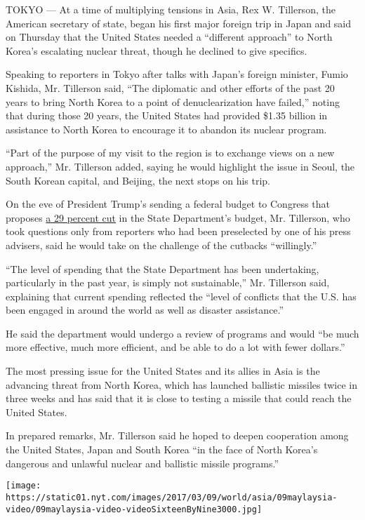 TOKYO --- At a time of multiplying tensions in Asia, Rex W. Tillerson,
the American secretary of state, began his first major foreign trip in
Japan and said on Thursday that the United States needed a ``different
approach'' to North Korea's escalating nuclear threat, though he
declined to give specifics.

Speaking to reporters in Tokyo after talks with Japan's foreign
minister, Fumio Kishida, Mr. Tillerson said, ``The diplomatic and other
efforts of the past 20 years to bring North Korea to a point of
denuclearization have failed,'' noting that during those 20 years, the
United States had provided \$1.35 billion in assistance to North Korea
to encourage it to abandon its nuclear program.

``Part of the purpose of my visit to the region is to exchange views on
a new approach,'' Mr. Tillerson added, saying he would highlight the
issue in Seoul, the South Korean capital, and Beijing, the next stops on
his trip.

On the eve of President Trump's sending a federal budget to Congress
that proposes
\href{https://www.nytimes.com/interactive/2017/03/15/us/politics/trump-budget-proposal.html}{a
29 percent cut} in the State Department's budget, Mr. Tillerson, who
took questions only from reporters who had been preselected by one of
his press advisers, said he would take on the challenge of the cutbacks
``willingly.''

``The level of spending that the State Department has been undertaking,
particularly in the past year, is simply not sustainable,'' Mr.
Tillerson said, explaining that current spending reflected the ``level
of conflicts that the U.S. has been engaged in around the world as well
as disaster assistance.''

He said the department would undergo a review of programs and would ``be
much more effective, much more efficient, and be able to do a lot with
fewer dollars.''

The most pressing issue for the United States and its allies in Asia is
the advancing threat from North Korea, which has launched ballistic
missiles twice in three weeks and has said that it is close to testing a
missile that could reach the United States.

In prepared remarks, Mr. Tillerson said he hoped to deepen cooperation
among the United States, Japan and South Korea ``in the face of North
Korea's dangerous and unlawful nuclear and ballistic missile programs.''

\texttt{[image: https://static01.nyt.com/images/2017/03/09/world/asia/09maylaysia-video/09maylaysia-video-videoSixteenByNine3000.jpg]}

